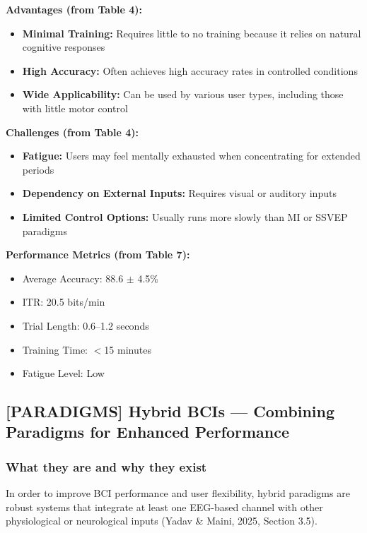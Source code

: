 \documentclass[12pt]{article}
\begin{document}
\textbf{Advantages (from Table 4):}
\begin{itemize}
    \item \textbf{Minimal Training:} Requires little to no training because it relies on natural cognitive responses
    \item \textbf{High Accuracy:} Often achieves high accuracy rates in controlled conditions
    \item \textbf{Wide Applicability:} Can be used by various user types, including those with little motor control
\end{itemize}

\textbf{Challenges (from Table 4):}
\begin{itemize}
    \item \textbf{Fatigue:} Users may feel mentally exhausted when concentrating for extended periods
    \item \textbf{Dependency on External Inputs:} Requires visual or auditory inputs
    \item \textbf{Limited Control Options:} Usually runs more slowly than MI or SSVEP paradigms
\end{itemize}

\textbf{Performance Metrics (from Table 7):}
\begin{itemize}
    \item Average Accuracy: 88.6 $\pm$ 4.5\%
    \item ITR: 20.5 bits/min
    \item Trial Length: 0.6–1.2 seconds
    \item Training Time: $<$15 minutes
    \item Fatigue Level: Low
\end{itemize}

\subsection{[PARADIGMS] Hybrid BCIs — Combining Paradigms for Enhanced Performance}

\subsubsection{What they are and why they exist}

In order to improve BCI performance and user flexibility, hybrid paradigms are robust systems that integrate at least one EEG-based channel with other physiological or neurological inputs (Yadav \& Maini, 2025, Section 3.5).
\end{document}
